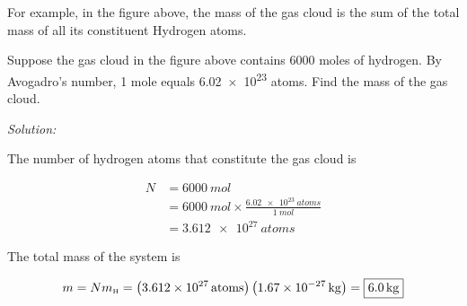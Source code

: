 \documentclass[dvipsnames]{article}
\begin{document}
\begin{center}
\begin{minipage}{6cm}
\centering
{}
\end{minipage}%
\begin{minipage}{5cm}
\centering
{}
\end{minipage}
\end{center}

For example, in the figure above, the mass of the gas cloud is the sum of the total mass of all its constituent Hydrogen atoms. 

\begin{example}
    Suppose the gas cloud in the figure above contains 6000 moles of hydrogen. By Avogadro's number, 1 mole equals \num{6.02e23} atoms. Find the mass of the gas cloud.
\end{example}

\textit{Solution:}

The number of hydrogen atoms that constitute the gas cloud is

\begin{align*}
    N &= \SI{6000}{mol} \\[1ex]
    &= \SI{6000}{mol} \times \frac{\SI{6.02e23}{atoms}}{\SI{1}{mol}} \\[1ex]
    &= \SI{3.612e27}{atoms}
\end{align*}

The total mass of the system is

\begin{equation*}
    m = N m_\text{\tiny H} = \left(\SI{3.612e27}{atoms}\right) \left(\SI{1.67e-27}{kg}\right) = \boxed{\SI{6.0}{kg}}
\end{equation*}
\end{document}
